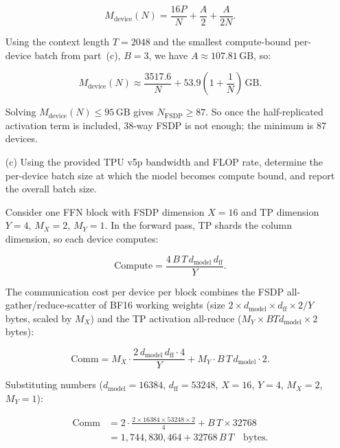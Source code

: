 \documentclass[letterpaper]{article}
\begin{document}
\begin{itemize}
		\begin{equation}
			M_{\text{device}}(N) = \frac{16P}{N} + \frac{A}{2} + \frac{A}{2N}.
		\end{equation}
		
		Using the context length $T=2048$ and the smallest compute-bound per-device batch from part~(c), $B=3$, we have $A \approx 107.81\,\text{GB}$, so:
		
		\begin{equation}
			M_{\text{device}}(N) \approx \frac{3517.6}{N} + 53.9\left(1 + \frac{1}{N}\right)\,\text{GB}.
		\end{equation}
		
		Solving $M_{\text{device}}(N) \leq 95\,\text{GB}$ gives $N_{\text{FSDP}} \geq 87$. So once the half-replicated activation term is included, 38-way FSDP is not enough; the minimum is 87 devices.
		
		\item[(c)] Using the provided TPU v5p bandwidth and FLOP rate, determine the per-device batch size at which the model becomes compute bound, and report the overall batch size.
		
		Consider one FFN block with FSDP dimension $X=16$ and TP dimension $Y=4$, $M_X=2$, $M_Y=1$.
		In the forward pass, TP shards the column dimension, so each device computes:
		
		\begin{equation}
			\text{Compute} = \frac{4\,B\,T\,d_{\text{model}}\,d_{\text{ff}}}{Y}.
		\end{equation}
		
		The communication cost per device per block combines the FSDP all-gather/reduce-scatter of BF16 working weights (size $2\times d_{\text{model}}\times d_{\text{ff}}\times 2/Y$ bytes, scaled by $M_X$) and the TP activation all-reduce ($M_Y\times B T d_{\text{model}}\times 2$ bytes):
		
		\begin{equation}
			\text{Comm} = M_X\cdot\frac{2\,d_{\text{model}}\,d_{\text{ff}}\cdot 4}{Y} + M_Y\cdot B\,T\,d_{\text{model}}\cdot 2.
		\end{equation}
		
		Substituting numbers ($d_{\text{model}}=16384$, $d_{\text{ff}}=53248$, $X=16$, $Y=4$, $M_X=2$, $M_Y=1$):
		
		\begin{align}
			\text{Comm} &= 2\cdot\frac{2\times 16384\times 53248\times 2}{4} + B\,T\times 32768 \\
			&= 1{,}744{,}830{,}464 + 32768\,B\,T \quad\text{bytes.}
		\end{align}
		

\end{itemize}
\end{document}
